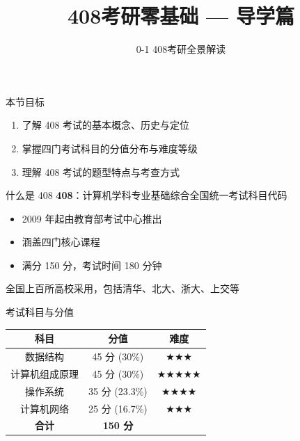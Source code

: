 \documentclass[10pt, aspectratio=169]{beamer}
\title{408考研零基础 --- 导学篇}
\subtitle{0-1 408考研全景解读}
\author{}
\date{}
\begin{document}
\begin{frame}{本节目标}
    \begin{enumerate}
        \item 了解 408 考试的基本概念、历史与定位
        \item 掌握四门考试科目的分值分布与难度等级
        \item 理解 408 考试的题型特点与考查方式
    \end{enumerate}
\end{frame}

\begin{frame}{什么是 408}
    \textbf{408}：计算机学科专业基础综合全国统一考试科目代码
    \vspace{0.5em}
    \begin{itemize}
        \item 2009 年起由教育部考试中心推出
        \item 涵盖四门核心课程
        \item 满分 150 分，考试时间 180 分钟
    \end{itemize}
    \vspace{0.5em}
    全国上百所高校采用，包括清华、北大、浙大、上交等
\end{frame}

\begin{frame}{考试科目与分值}
    \begin{center}
    \begin{tabular}{|c|c|c|}
        \hline
        \textbf{科目} & \textbf{分值} & \textbf{难度} \\
        \hline
        数据结构 & 45 分 (30\%) & $\bigstar$$\bigstar$$\bigstar$ \\
        \hline
        计算机组成原理 & 45 分 (30\%) & $\bigstar$$\bigstar$$\bigstar$$\bigstar$$\bigstar$ \\
        \hline
        操作系统 & 35 分 (23.3\%) & $\bigstar$$\bigstar$$\bigstar$$\bigstar$ \\
        \hline
        计算机网络 & 25 分 (16.7\%) & $\bigstar$$\bigstar$$\bigstar$ \\
        \hline
        \textbf{合计} & \textbf{150 分} & \\
        \hline
    \end{tabular}
    \end{center}
\end{frame}
\end{document}
